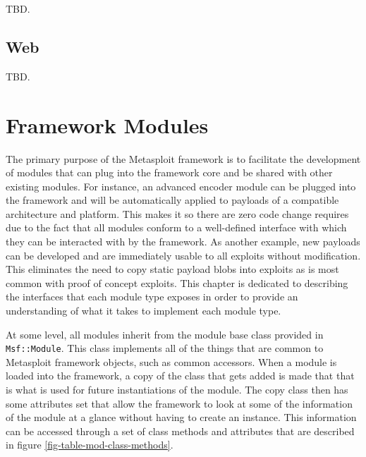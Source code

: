 \documentclass{report}
\begin{document}
TBD.

    \section{Web}


TBD.

\chapter{Framework Modules}
\label{framework-modules}

\par
The primary purpose of the Metasploit framework is to facilitate the
development of modules that can plug into the framework core and be
shared with other existing modules.  For instance, an advanced
encoder module can be plugged into the framework and will be
automatically applied to payloads of a compatible architecture and
platform.  This makes it so there are zero code change requires due
to the fact that all modules conform to a well-defined interface
with which they can be interacted with by the framework.  As another
example, new payloads can be developed and are immediately usable to
all exploits without modification.  This eliminates the need to copy
static payload blobs into exploits as is most common with proof of
concept exploits.  This chapter is dedicated to describing the
interfaces that each module type exposes in order to provide an
understanding of what it takes to implement each module type.

\par
At some level, all modules inherit from the module base class
provided in \texttt{Msf::Module}.  This class implements all of the
things that are common to Metasploit framework objects, such as
common accessors.  When a module is loaded into the framework, a
copy of the class that gets added is made that that is what is used
for future instantiations of the module.  The copy class then has
some attributes set that allow the framework to look at some of the
information of the module at a glance without having to create an
instance.  This information can be accessed through a set of class
methods and attributes that are described in figure
\ref{fig-table-mod-class-methods}.
\end{document}
